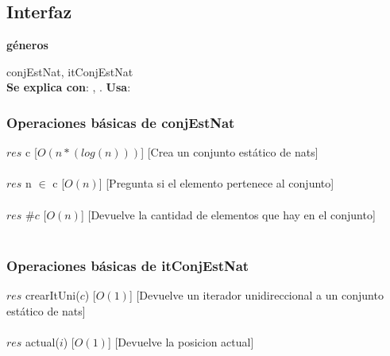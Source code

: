 
\subsection{Interfaz}

   \parbox{1.7cm}{\textbf{g\'eneros}} conjEstNat, itConjEstNat\\

  \textbf{Se explica con}: , .
  \textbf{Usa}: \

  \subsubsection{Operaciones b\'asicas de conjEstNat}
  {$res$ \igobs c}
  [$O(n*(log (n)))$]
  [Crea un conjunto est\'atico de nats]\\\\
  
  {$res$ \igobs n $\in$ c}
  [$O(n)$]
  [Pregunta si el elemento pertenece al conjunto]\\\\

  {$res$ \igobs \#$c$}
  [$O(n)$]
  [Devuelve la cantidad de elementos que hay en el conjunto]\\\\  
  \subsubsection{Operaciones b\'asicas de itConjEstNat}  
  
  {$res$ \igobs crearItUni($c$)}
  [$O(1)$]
  [Devuelve un iterador unidireccional a un conjunto est\'atico de nats]\\\\
  
  {$res$ \igobs actual($i$)}
  [$O(1)$]
  [Devuelve la posicion actual]\\\\
  
